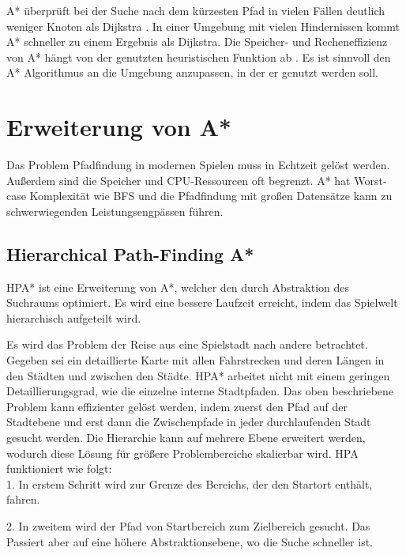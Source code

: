A* überprüft bei der Suche nach dem kürzesten Pfad in vielen Fällen deutlich weniger Knoten als Dijkstra \cite[S.20f]{compare}. In einer Umgebung mit vielen Hindernissen kommt A* schneller zu einem Ergebnis als Dijkstra. Die Speicher- und Recheneffizienz von A* hängt von der genutzten heuristischen Funktion ab \cite[S.237]{sim}. Es ist sinnvoll den A* Algorithmus an die Umgebung anzupassen, in der er genutzt werden soll.

\section{Erweiterung von A*}
Das Problem Pfadfindung in modernen Spielen muss in Echtzeit gelöst werden. Außerdem sind die Speicher und CPU-Ressourcen oft begrenzt. A* hat Worst-case Komplexität wie BFS\cite{astar} und die Pfadfindung mit großen Datensätze kann zu schwerwiegenden Leistungsengpässen führen. 


\subsection{Hierarchical Path-Finding A*}
HPA* ist eine Erweiterung von A*, welcher den durch Abstraktion des Suchraums optimiert\cite{hpa}. Es wird eine bessere Laufzeit erreicht, indem das Spielwelt hierarchisch aufgeteilt wird. 

Es wird das Problem der Reise aus eine Spielstadt nach andere betrachtet. Gegeben sei ein detaillierte Karte mit allen Fahrstrecken und deren Längen in den Städten und zwischen den Städte. HPA* arbeitet nicht mit einem geringen Detaillierungsgrad, wie die einzelne interne Stadtpfaden. Das oben beschriebene Problem kann effizienter gelöst werden, indem zuerst den Pfad auf der Stadtebene und erst dann die Zwischenpfade in jeder durchlaufenden Stadt gesucht werden. Die Hierarchie kann auf mehrere Ebene erweitert werden, wodurch diese Lösung für größere Problembereiche skalierbar wird. HPA funktioniert wie folgt:\\

1. In erstem Schritt wird zur Grenze des Bereichs, der den Startort enthält, fahren.

2. In zweitem wird der Pfad von Startbereich zum Zielbereich gesucht. Das Passiert aber auf eine höhere Abstraktionsebene, wo die Suche schneller ist. 

